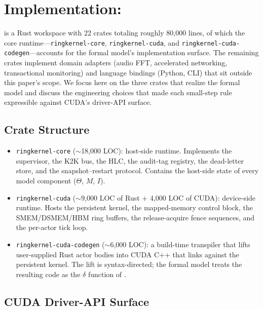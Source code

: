 \section{Implementation: \system{}}
\label{sec:implementation}

\system{} is a Rust workspace with 22 crates totaling roughly 80,000
lines, of which the core
runtime—\texttt{ringkernel-core},
\texttt{ringkernel-cuda}, and
\texttt{ringkernel-cuda-codegen}—accounts for the formal model's
implementation surface.  The remaining crates implement domain
adapters (audio FFT, accelerated networking, transactional
monitoring) and language bindings (Python, CLI) that sit outside
this paper's scope.  We focus here on the three crates that realize
the formal model and discuss the engineering choices that made each
small-step rule expressible against CUDA's driver-API surface.

\subsection{Crate Structure}
\label{sec:implementation:crates}

\begin{itemize}
\item \texttt{ringkernel-core} (\(\sim\)18,000 LOC): host-side
runtime. Implements the supervisor, the K2K bus, the HLC, the
audit-tag registry, the dead-letter store, and the snapshot--restart
protocol. Contains the host-side state of every model component
(\(\Theta\), \(M\), \(I\)).

\item \texttt{ringkernel-cuda} (\(\sim\)9,000 LOC of Rust + 4,000
LOC of CUDA): device-side runtime. Hosts the persistent kernel, the
mapped-memory control block, the SMEM/DSMEM/HBM ring buffers, the
release-acquire fence sequences, and the per-actor tick loop.

\item \texttt{ringkernel-cuda-codegen} (\(\sim\)6,000 LOC): a
build-time transpiler that lifts user-supplied Rust actor bodies into
CUDA C++ that links against the persistent kernel. The lift is
syntax-directed; the formal model treats the resulting code as the
\(\delta\) function of .
\end{itemize}

\subsection{CUDA Driver-API Surface}
\label{sec:implementation:driver}

